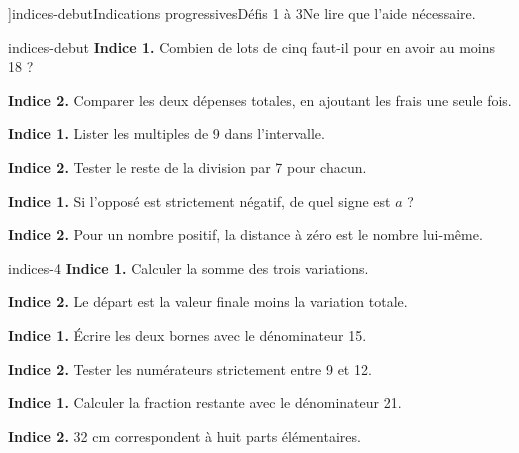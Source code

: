 \editionPage[\pdfbookmark[0]{Indications des défis}{bm-indices-debut-parent}]{indices-debut}{Indications progressives}{Défis 1 à 3}{Ne lire que l’aide nécessaire.}
\begin{blocEdition}{indices-debut}
\textbf{Indice 1.} Combien de lots de cinq faut-il pour en avoir au moins 18 ?\par\medskip\textbf{Indice 2.} Comparer les deux dépenses totales, en ajoutant les frais une seule fois.\par
{}\textbf{Indice 1.} Lister les multiples de 9 dans l’intervalle.\par\medskip\textbf{Indice 2.} Tester le reste de la division par 7 pour chacun.\par
{}\textbf{Indice 1.} Si l’opposé est strictement négatif, de quel signe est $a$ ?\par\medskip\textbf{Indice 2.} Pour un nombre positif, la distance à zéro est le nombre lui-même.\par

\end{blocEdition}
\begin{blocEdition}{indices-4}
\textbf{Indice 1.} Calculer la somme des trois variations.\par\medskip\textbf{Indice 2.} Le départ est la valeur finale moins la variation totale.\par
{}\textbf{Indice 1.} Écrire les deux bornes avec le dénominateur 15.\par\medskip\textbf{Indice 2.} Tester les numérateurs strictement entre 9 et 12.\par
{}\textbf{Indice 1.} Calculer la fraction restante avec le dénominateur 21.\par\medskip\textbf{Indice 2.} 32 cm correspondent à huit parts élémentaires.\par

\end{blocEdition}
